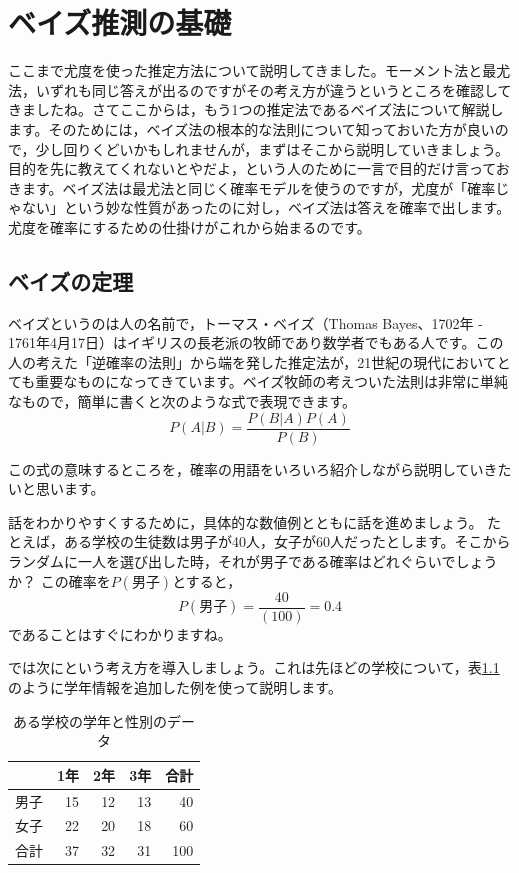 \documentclass{ltjbook}
\begin{document}
\chapter{ベイズ推測の基礎}
\label{chapter25}
ここまで尤度を使った推定方法について説明してきました。モーメント法と最尤法，いずれも同じ答えが出るのですがその考え方が違うというところを確認してきましたね。さてここからは，もう1つの推定法であるベイズ法について解説します。そのためには，ベイズ法の根本的な法則について知っておいた方が良いので，少し回りくどいかもしれませんが，まずはそこから説明していきましょう。目的を先に教えてくれないとやだよ，という人のために一言で目的だけ言っておきます。ベイズ法は最尤法と同じく確率モデルを使うのですが，尤度が「確率じゃない」という妙な性質があったのに対し，ベイズ法は答えを確率で出します。尤度を確率にするための仕掛けがこれから始まるのです。

\section{ベイズの定理}
ベイズというのは人の名前で，トーマス・ベイズ（Thomas Bayes、1702年 - 1761年4月17日）はイギリスの長老派の牧師であり数学者でもある人です。この人の考えた「逆確率の法則」から端を発した推定法が，21世紀の現代においてとても重要なものになってきています。ベイズ牧師の考えついた法則は非常に単純なもので，簡単に書くと次のような式で表現できます。
\[ P(A|B) = \frac{P(B|A)P(A)}{P(B)} \]

この式の意味するところを，確率の用語をいろいろ紹介しながら説明していきたいと思います。

話をわかりやすくするために，具体的な数値例とともに話を進めましょう。
たとえば，ある学校の生徒数は男子が40人，女子が60人だったとします。そこからランダムに一人を選び出した時，それが男子である確率はどれぐらいでしょうか？ この確率を$P(\mbox{男子})$とすると，
\[P(\mbox{男子})=\frac{40}{(100)}=0.4 \]
であることはすぐにわかりますね。

では次にという考え方を導入しましょう。これは先ほどの学校について，表\ref{tbl::24_02}のように学年情報を追加した例を使って説明します。

\begin{table}[ht]
    \centering
    \caption{ある学校の学年と性別のデータ} 
    \begin{tabular}{rrrrr}
      \hline
      & 1年 & 2年 & 3年 & 合計 \\
    \hline
    男子 & 15 & 12 & 13 & 40\\
    女子 & 22 & 20 & 18 & 60\\\hline
    合計 & 37 & 32 & 31 & 100\\\hline
    \end{tabular}
      \label{tbl::24_02}
\end{table}
\end{document}
